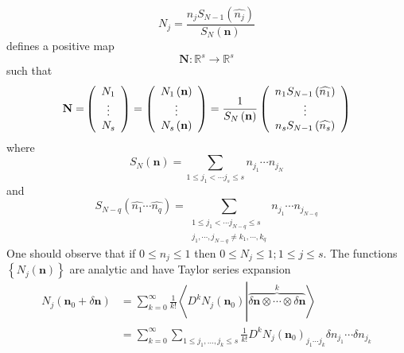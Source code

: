 \documentclass[aps,preprint]{revtex4}%
\begin{document}
\begin{equation}
N_{j}=\frac{n_{j}S_{N-1}\left(  \widehat{n_{j}}\right)  }{S_{N}\left(
\mathbf{n}\right)  }%
\end{equation}
defines a positive map
\begin{equation}
\mathbf{N}:\mathbb{R}^{s}\rightarrow\mathbb{R}^{s}%
\end{equation}
such that
\begin{equation}
\mathbf{N=}\left(
\begin{array}
[c]{c}%
N_{1}\\
\vdots\\
N_{s}%
\end{array}
\right)  =\left(
\begin{array}
[c]{c}%
N_{1}\left(  \mathbf{n}\right) \\
\vdots\\
N_{s}\left(  \mathbf{n}\right)
\end{array}
\right)  =\frac{1}{S_{N}\left(  \mathbf{n}\right)  }\left(
\begin{array}
[c]{c}%
n_{1}S_{N-1}\left(  \widehat{n_{1}}\right) \\
\vdots\\
n_{s}S_{N-1}\left(  \widehat{n_{s}}\right)
\end{array}
\right)
\end{equation}
where
\begin{equation}
S_{N}\left(  \mathbf{n}\right)  =\sum_{1\leq j_{1}<\cdots j_{s}\leq s}%
n_{j_{1}}\cdots n_{j_{N}}%
\end{equation}
and
\begin{equation}
S_{N-q}\left(  \widehat{n_{1}}\cdots\widehat{n_{q}}\right)  =\sum
_{\substack{1\leq j_{1}<\cdots j_{N-q}\leq s\\j_{1},\cdots,j_{N-q}\neq
k_{1},\cdots,k_{q}}}n_{j_{1}}\cdots n_{j_{N-q}}%
\end{equation}
One should observe that if $0\leq n_{j}\leq1$ then $0\leq N_{j}\leq1;1\leq
j\leq s$. The functions $\left\{  N_{j}\left(  \mathbf{n}\right)  \right\}  $
are analytic and have Taylor series expansion
\begin{align}
N_{j}\left(  \mathbf{n}_{0}+\delta\mathbf{n}\right)   &  =\sum_{k=0}^{\infty
}\frac{1}{k!}\left\langle D^{k}N_{j}\left(  \mathbf{n}_{0}\right)  \left\vert
\overset{k}{\overbrace{\delta\mathbf{n}\otimes\cdots\otimes\delta\mathbf{n}}%
}\right.  \right\rangle \\
&  =\sum_{k=0}^{\infty}\sum_{1\leq j_{1},\ldots,j_{k}\leq s}\frac{1}{k!}%
D^{k}N_{j}\left(  \mathbf{n}_{0}\right)  _{j_{1}\cdots j_{k}}\delta n_{j_{1}%
}\cdots\delta n_{j_{k}}%
\end{align}
\end{document}
